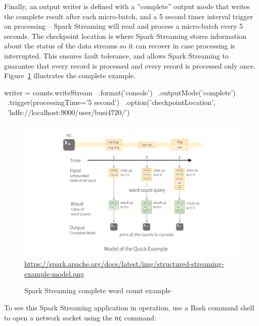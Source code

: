 Finally, an output writer is defined with a ''complete'' output mode that writes the complete result after each micro-batch, and a 5 second timer interval trigger on processing -- Spark Streaming will read and process a micro-batch every 5 seconds. The checkpoint location is where Spark Streaming stores information about the status of the data streams so it can recover in case processing is interrupted. This ensures fault tolerance, and allows Spark Streaming to guarantee that every record is processed and every record is processed only once. Figure~\ref{fig:streamingexample} illustrates the complete example.

\begin{samepage}
\begin{pythoncode}
writer = counts.writeStream \
           .format('console') \
           .outputMode('complete') \
           .trigger(processingTime='5 second') \
           .option('checkpointLocation', \
               'hdfs://localhost:9000/user/busi4720/')
\end{pythoncode}
\end{samepage}

\begin{figure}
\centering

\includegraphics[width=\textwidth]{structured-streaming-example-model.png} \\

\scriptsize\url{https://spark.apache.org/docs/latest/img/structured-streaming-example-model.png}
\caption{Spark Streaming complete word count example}
\label{fig:streamingexample}
\end{figure}

To see this Spark Streaming application in operation, use a Bash command shell to open a network socket using the \texttt{nc} command:

